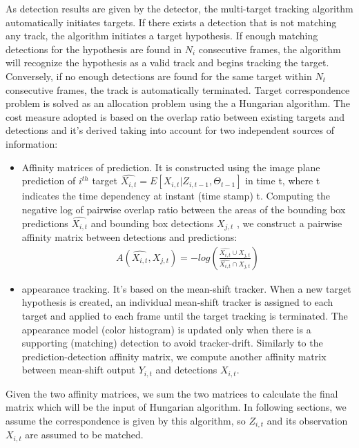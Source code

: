 As detection results are given by the detector, the multi-target tracking algorithm automatically initiates targets. If there exists a detection that is not matching any track, the algorithm initiates a target hypothesis. 
If enough matching detections for the hypothesis are found in $N_i$ consecutive frames, the algorithm will recognize the hypothesis as a valid track and begins tracking the target. Conversely, if no enough detections are found for the same target within $N_t$ consecutive frames, the track is automatically terminated.
Target correspondence problem is solved as an allocation problem using the a Hungarian algorithm. The cost measure adopted is based on the overlap ratio between existing targets and detections and it's derived taking into account for two independent sources of information: 
\begin{itemize}
\item Affinity matrices of prediction. It is constructed using the image plane prediction of $i^{th}$ target $\hat{X_{i,t}} = E[ X_{i,t} | Z_{i,t-1} , \Theta_{t−1} ] $ in time t,
where t indicates the time dependency at instant (time stamp) t. Computing the negative log of pairwise overlap ratio between the areas of the bounding box predictions  $\hat{X_{i,t}}$ and bounding box detections $X_{j,t}$ ,  we construct a pairwise affinity matrix between detections and predictions:
\begin{eqnarray} \label{eqn: Affinity Matrix}
A(\hat{X_{i,t}} , X_{j,t} ) = − log( \frac{ \hat{X_{i,t}} \cup X_{j,t}}{ \hat{X_{i,t}} \cap X_{j,t}} )
\end{eqnarray} 
\item appearance tracking. It's based on the mean-shift tracker. When a new target hypothesis is created, an individual mean-shift tracker is assigned to each target and applied to each frame until the target tracking is terminated. The appearance model (color histogram) is updated only when there is a supporting (matching) detection to avoid tracker-drift. Similarly to the prediction-detection affinity matrix, we compute another affinity matrix between mean-shift output $Y_{i,t}$ and detections ${X_{i,t}}$.
\end{itemize}
Given the two affinity matrices, we sum the two matrices to calculate the final matrix which will be the input of Hungarian algorithm. 
In following sections, we assume the correspondence is given by this algorithm, so $Z_{i,t}$ and its observation ${X_{i,t}}$ are assumed to be matched.
\newpage

